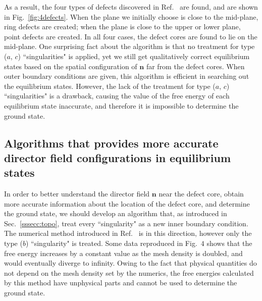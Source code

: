 \documentclass[nottitlepage]{article}
\begin{document}
 As a result, the four types of defects discovered in Ref.~\cite{liang} are found, and are shown in Fig.~\ref{fig:4defects}. When the plane we initially choose is close to the mid-plane, ring defects are created; when the plane is close to the upper or lower plane, point defects are created. In all four cases, the defect cores are found to lie on the mid-plane. One surprising fact about the algorithm is that no treatment for  type ($a$, $c$) ``singularities" is applied, yet we still get qualitatively correct equilibrium states based on the spatial configuration of $\mathbf{n}$ far from the defect cores. When outer boundary conditions are given, this algorithm is efficient in searching out the equilibrium states. However, %
the lack of the treatment for type ($a$, $c$) ``singularities" is a drawback, causing the value of the free energy of each equilibrium state inaccurate, and therefore it is impossible to determine the ground state.


 
\subsection {Algorithms that provides more accurate director field configurations in equilibrium states}\label{ssssec:uniaxial}

In order to better understand the director field $\mathbf{n}$ near the defect core, obtain more accurate information about the location of the defect core, and determine the ground state, we should develop an algorithm that, as introduced in Sec.~\ref{sssecc:topo}, treat every ``singularity" as a new inner boundary condition. The numerical method introduced in Ref.~\cite{liang} is in this direction, however only the type ($b$) ``singularity" is treated.  
Some data reproduced in Fig.~$4$ shows that %
the free energy increases by a constant value as the mesh density is doubled, and would eventually diverge to infinity. Owing to the fact that physical quantities do not depend on the mesh density set by the numerics, the free energies calculated by this method have unphysical parts and cannot be used to determine the ground state. 
\end{document}
